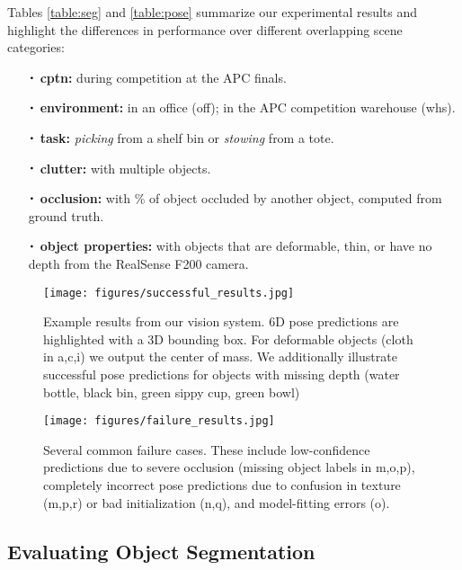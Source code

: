 \documentclass[letterpaper, 10 pt, conference]{ieeeconf}  %
\newcommand*{\Cdot}{\raisebox{-0.25ex}{\scalebox{1.75}{$\cdot$}}}
\begin{document}
Tables \ref{table:seg} and \ref{table:pose} summarize our experimental results and highlight the differences in performance over different overlapping scene categories:
%
\begin{itemize}
\item[$\Cdot$] \textbf{cptn:} during competition at the APC finals.
%
\item[$\Cdot$] \textbf{environment:} in an office (off); in the APC competition warehouse (whs).
%
\item[$\Cdot$] \textbf{task:} \textit{picking} from a shelf bin or \textit{stowing} from a tote.
%
\item[$\Cdot$] \textbf{clutter:} with multiple objects.
%
\item[$\Cdot$] \textbf{occlusion:} with \% of object occluded by another object, computed from ground truth.
%
\item[$\Cdot$] \textbf{object properties:} with objects that are deformable, thin, or have no depth from the RealSense F200 camera.
\end{itemize}

\begin{figure*}[t]
 \vspace{2mm}
\centering
  \texttt{[image: figures/successful\_results.jpg]}%
    \vspace{-2mm}
  \caption{Example results from our vision system. 6D pose predictions are highlighted with a 3D bounding box. For deformable objects (cloth in a,c,i) we output the center of mass. We additionally illustrate successful pose predictions for objects with missing depth (water bottle, black bin, green sippy cup, green bowl)}
  \label{fig:successful_results}

\vspace{2mm}
\centering
  \texttt{[image: figures/failure\_results.jpg]}%
  \vspace{-2mm}
  \caption{Several common failure cases. These include low-confidence predictions due to severe occlusion (missing object labels in m,o,p), completely incorrect pose predictions due to confusion in texture (m,p,r) or bad initialization (n,q), and model-fitting errors (o).}
  \label{fig:failure_results}
  \vspace{-5mm}
\end{figure*}



\subsection{Evaluating Object Segmentation}
\end{document}
